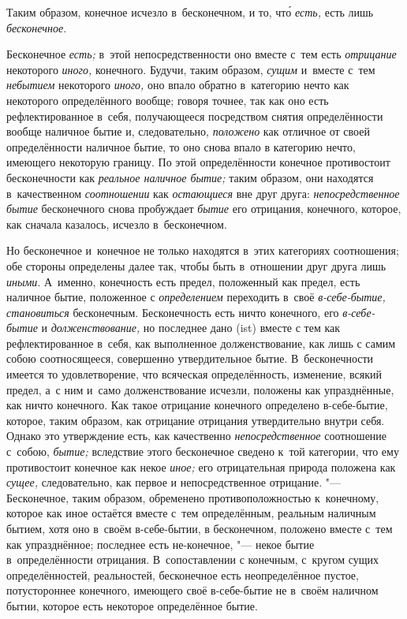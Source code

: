 Таким образом, конечное исчезло в~бесконечном,
и то, чт\'{о} {\em есть,} есть лишь {\em бесконечное}.


Бесконечное {\em есть;} в~этой непосредственности оно
вместе с~тем есть {\em отрицание} некоторого
{\em иного,} конечного. Будучи, таким образом,
{\em сущим} и~вместе с~тем {\em небытием} некоторого
{\em иного,} оно впало обратно в~категорию нечто как
некоторого определённого вообще; говоря точнее, так как оно есть
рефлектированное в~себя, получающееся посредством снятия определённости
вообще наличное бытие и, следовательно, {\em положено}
как отличное от своей определённости наличное бытие, то оно снова впало в
категорию нечто, имеющего некоторую границу. По этой определённости
конечное противостоит бесконечности как {\em реальное
наличное бытие;} таким образом, они находятся в~качественном
{\em соотношении} как
{\em остающиеся} вне друг друга:
{\em непосредственное бытие} бесконечного снова
пробуждает {\em бытие} его отрицания, конечного,
которое, как сначала казалось, исчезло в~бесконечном.

Но бесконечное и~конечное не только находятся в~этих категориях соотношения;
обе стороны определены далее так, чтобы быть в~отношении друг друга лишь
{\em иными}. А~именно, конечность есть предел,
положенный как предел, есть наличное бытие, положенное с
{\em определением} переходить в~своё
{\em в-себе-бытие,}
{\em становиться} бесконечным. Бесконечность есть ничто
конечного, его {\em в-себе-бытие} и
{\em долженствование,} но последнее дано (ist) вместе с
тем как рефлектированное в~себя, как выполненное долженствование, как лишь
с самим собою соотносящееся, совершенно утвердительное бытие.
В~бесконечности имеется то удовлетворение, что всяческая определённость,
изменение, всякий предел, а~с ним и~само долженствование исчезли, положены
как упразднённые, как ничто конечного. Как такое отрицание конечного
определено в-себе-бытие, которое, таким образом, как отрицание отрицания
утвердительно внутри себя. Однако это утверждение есть, как качественно
{\em непосредственное} соотношение с~собою,
{\em бытие;} вследствие этого бесконечное сведено к~той
категории, что ему противостоит конечное как некое
{\em иное;} его отрицательная природа положена как
{\em сущее,} следовательно, как первое и
непосредственное отрицание. "--- Бесконечное, таким образом, обременено
противоположностью к~конечному, которое как иное остаётся вместе с~тем
определённым, реальным наличным бытием, хотя оно в~своём в-себе-бытии, в
бесконечном, положено вместе с~тем как упразднённое; последнее есть
не-конечное, "--- некое бытие в~определённости отрицания. В~сопоставлении с
конечным, с~кругом сущих определённостей, реальностей, бесконечное есть
неопределённое пустое, потустороннее конечного, имеющего своё в-себе-бытие
не в~своём наличном бытии, которое есть некоторое определённое бытие.

